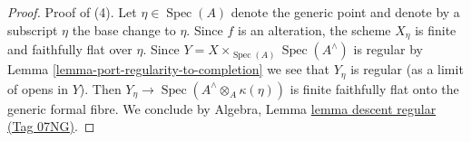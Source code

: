 \documentclass{amsart}
\theoremstyle{plain}
\theoremstyle{definition}
\theoremstyle{remark}
\numberwithin{equation}{subsection}
\def\Spec{\mathop{\mathrm{Spec}}}
\begin{document}
\begin{proof}
\medskip\noindent
Proof of (4). Let $\eta \in \Spec(A)$ denote the generic point
and denote by a subscript $\eta$ the base change to $\eta$.
Since $f$ is an alteration, the scheme $X_\eta$ is finite and
faithfully flat over $\eta$. Since $Y = X \times_{\Spec(A)} \Spec(A^\wedge)$
is regular by Lemma \ref{lemma-port-regularity-to-completion}
we see that $Y_\eta$ is regular (as a limit of opens in $Y$).
Then $Y_\eta \to \Spec(A^\wedge \otimes_A \kappa(\eta))$ is finite
faithfully flat onto the generic formal fibre. We conclude by
Algebra, Lemma \href{https://stacks.math.columbia.edu/tag/07NG}{lemma descent regular (Tag 07NG)}.
\end{proof}
\end{document}
